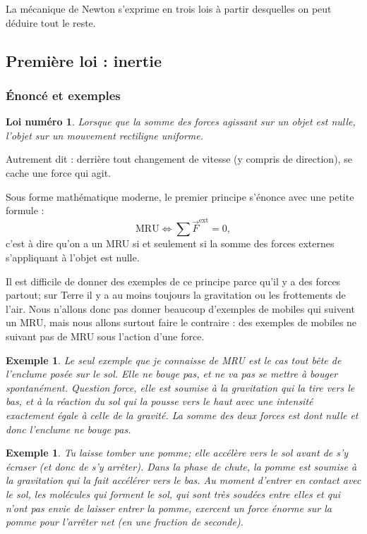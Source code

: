 \documentclass[a4paper,12pt]{book}
\newcounter{numloiphyz}
\theoremstyle{mes_exemples}	\newtheorem{exemple}[numtho]{Exemple}
\theoremstyle{mes_tho}
\newtheorem{loiphyz}[numloiphyz]{Loi numéro}
\newcommand{\fF}{\overrightarrow{F}}
\begin{document}
La mécanique de Newton s'exprime en trois lois à partir desquelles on peut déduire tout le reste.

\subsection{Première loi : inertie}

\subsubsection{Énoncé et exemples}

\setcounter{numloiphyz}{0}
\begin{loiphyz}
Lorsque que la somme des forces agissant sur un objet est nulle, l'objet sur un mouvement rectiligne uniforme.
\end{loiphyz}
Autrement dit : derrière tout changement de vitesse (y compris de direction), se cache une force qui agit.

Sous forme mathématique moderne, le premier principe s'énonce avec une petite formule :
\begin{equation}
 \mathrm{MRU}\Longleftrightarrow \sum \fF^{\mathrm{ext}}=0,
\end{equation}
c'est à dire qu'on a un MRU si et seulement si la somme des forces externes s'appliquant à l'objet est nulle.

Il est difficile de donner des exemples de ce principe parce qu'il y a des forces partout; sur Terre il y a au moins toujours la gravitation ou les frottements de l'air. Nous n'allons donc pas donner beaucoup d'exemples de mobiles qui suivent un MRU, mais nous allons surtout faire le contraire : des exemples de mobiles ne suivant pas de MRU sous l'action d'une force.


\begin{exemple}
Le seul exemple que je connaisse de MRU est le cas tout bête de l'enclume posée sur le sol. Elle ne bouge pas, et ne va pas se mettre à bouger spontanément. Question force, elle est soumise à la gravitation qui la tire vers le bas, et à la réaction du sol qui la pousse vers le haut avec une intensité exactement égale à celle de la gravité. La somme des deux forces est dont nulle et donc l'enclume ne bouge pas.
\end{exemple}


\begin{exemple}
Tu laisse tomber une pomme; elle accélère vers le sol avant de s'y écraser (et donc de s'y arrêter). Dans la phase de chute, la pomme est soumise à la gravitation qui la fait accélérer vers le bas. Au moment d'entrer en contact avec le sol, les molécules qui forment le sol, qui sont très soudées entre elles et qui n'ont pas envie de laisser entrer la pomme, exercent un force énorme sur la pomme pour l'arrêter net (en une fraction de seconde).
\end{exemple}
\end{document}
